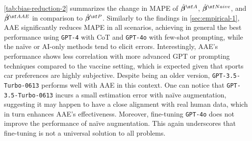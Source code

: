 \cref{tab:bias-reduction-2} summarizes the change in MAPE of $\hat{\betavec}^{\sf A}$, $\hat{\betavec}^{\sf Naive}$, and $\hat{\betavec}^{\sf AAE}$ in comparison to $\hat{\betavec}^{\sf P}$. Similarly to the findings in \cref{sec:empirical-1}, AAE significantly reduces MAPE in all scenarios, achieving in general the best performance using \texttt{GPT-4} with CoT and \texttt{GPT-4o} with few-shot prompting, while the na\"ive or AI-only methods tend to elicit errors. Interestingly, AAE's performance shows less correlation with more advanced GPT or prompting techniques compared to the vaccine setting, which is expected given that sports car preferences are highly subjective. Despite being an older version, \texttt{GPT-3.5-Turbo-0613} performs well with AAE in this context. One can notice that \texttt{GPT-3.5-Turbo-0613} incurs a small estimation error with na\"ive augmentation, suggesting it may happen to have a close alignment with real human data, which in turn enhances AAE's effectiveness. Moreover, fine-tuning \texttt{GPT-4o} does not improve the performance of na\"ive augmentation. This again underscores that fine-tuning is not a universal solution to all problems.

